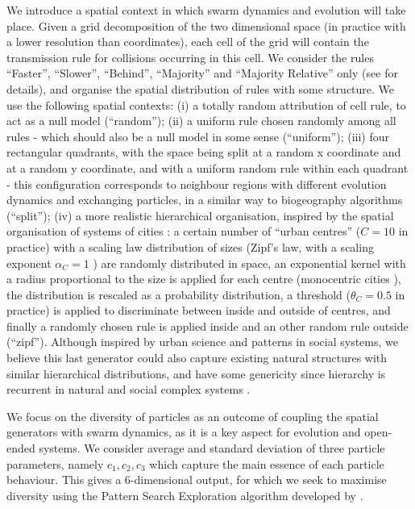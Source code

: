 \documentclass[letterpaper]{article}
\begin{document}
We introduce a spatial context in which swarm dynamics and evolution will take place. Given a grid decomposition of the two dimensional space (in practice with a lower resolution than coordinates), each cell of the grid will contain the transmission rule for collisions occurring in this cell. We consider the rules ``Faster'', ``Slower'', ``Behind'', ``Majority'' and ``Majority Relative'' only (see \citep{sayama2018seeking} for details), and organise the spatial distribution of rules with some structure. We use the following spatial contexts: (i) a totally random attribution of cell rule, to act as a null model (``random''); (ii) a uniform rule chosen randomly among all rules - which should also be a null model in some sense (``uniform''); (iii) four rectangular quadrants, with the space being split at a random x coordinate and at a random y coordinate, and with a uniform random rule within each quadrant - this configuration corresponds to neighbour regions with different evolution dynamics and exchanging particles, in a similar way to biogeography algorithms (``split''); (iv) a more realistic hierarchical organisation, inspired by the spatial organisation of systems of cities \citep{batty2008size}: a certain number of ``urban centres'' ($C=10$ in practice) with a scaling law distribution of sizes (Zipf's law, with a scaling exponent $\alpha_C = 1$ \citep{pumain2006evolutionary}) are randomly distributed in space, an exponential kernel with a radius proportional to the size is applied for each centre (monocentric cities \citep{lemoy2020evidence}), the distribution is rescaled as a probability distribution, a threshold ($\theta_C = 0.5$ in practice) is applied to discriminate between inside and outside of centres, and finally a randomly chosen rule is applied inside and an other random rule outside (``zipf''). Although inspired by urban science and patterns in social systems, we believe this last generator could also capture existing natural structures with similar hierarchical distributions, and have some genericity since hierarchy is recurrent in natural and social complex systems \citep{pumain2006hierarchy}.

We focus on the diversity of particles as an outcome of coupling the spatial generators with swarm dynamics, as it is a key aspect for evolution and open-ended systems. We consider average and standard deviation of three particle parameters, namely $c_1, c_2, c_3$ which capture the main essence of each particle behaviour. This gives a 6-dimensional output, for which we seek to maximise diversity using the Pattern Search Exploration algorithm developed by \citep{cherel2015beyond}.
\end{document}
